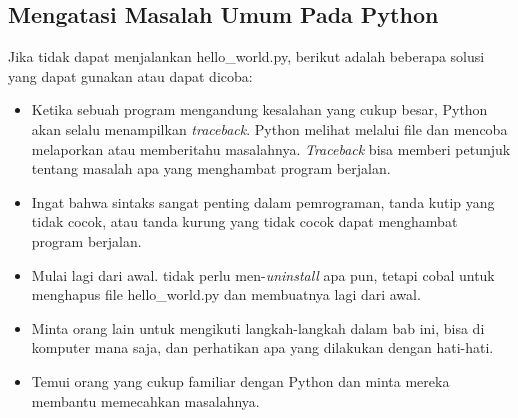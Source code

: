 \subsection{Mengatasi Masalah Umum Pada Python}
Jika tidak dapat menjalankan hello\_world.py, berikut adalah beberapa solusi yang dapat gunakan atau dapat dicoba:
\begin{itemize}
\item Ketika sebuah program mengandung kesalahan yang cukup besar, Python akan selalu menampilkan \textit{traceback}. Python melihat melalui file dan mencoba melaporkan atau memberitahu masalahnya. \textit{Traceback} bisa memberi petunjuk tentang masalah apa yang menghambat program berjalan.
\item  Ingat bahwa sintaks sangat penting dalam pemrograman, tanda kutip yang tidak cocok, atau tanda kurung yang tidak cocok dapat menghambat program berjalan.
\item Mulai lagi dari awal. tidak perlu men-\textit{uninstall} apa pun, tetapi cobal untuk menghapus file hello\_world.py dan membuatnya lagi dari awal.
\item Minta orang lain untuk mengikuti langkah-langkah dalam bab ini, bisa di komputer mana saja, dan perhatikan apa yang dilakukan dengan hati-hati.
\item Temui orang yang cukup familiar dengan Python dan minta mereka membantu memecahkan masalahnya.
\end{itemize}
